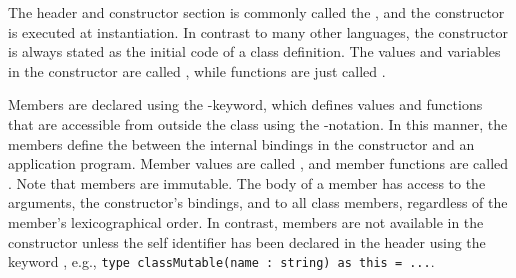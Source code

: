 \documentclass[fsharpNotes.tex]{subfiles}
\begin{document}
The header and constructor section is commonly called the , and the constructor is executed at instantiation. In contrast to many other languages, the constructor is always stated as the initial code of a class definition.
The values and variables in the constructor are called , while functions are just called .

Members are declared using the -keyword, which defines values and functions that are accessible from outside the class using the -notation. In this manner, the members define the  between the internal bindings in the constructor and an application program. Member values are called , and
member functions are called . Note that members are immutable.
The body of a member has access to the arguments, the constructor's bindings, and to all class members, regardless of the member's lexicographical order. 
In contrast, members are not available in the constructor unless the self identifier has been declared in the header using the keyword , e.g., \lstinline{type classMutable(name : string) as this = ...}.
\end{document}
